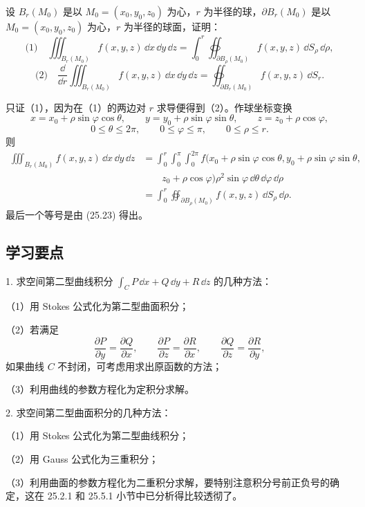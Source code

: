 \begin{xexample}[25.5.3]
设 $B_r(M_0)$ 是以 $M_0=(x_0,y_0,z_0)$ 为心，$r$ 为半径的球，$\partial B_r(M_0)$ 是以 $M_0=(x_0,y_0,z_0)$ 为心，$r$ 为半径的球面，证明：
\[
  \text{(1)}\quad \iiint_{B_r(M_0)}f(x,y,z)\,\dd x\,\dd y\,\dd z
  =\int_0^r\oiint_{\partial B_\rho(M_0)}f(x,y,z)\,\dd S_\rho\,\dd\rho,
\]
\[
  \text{(2)}\quad \frac\dd{\dd r}\iiint_{B_r(M_0)}f(x,y,z)\,\dd x\,\dd y\,\dd z
  =\oiint_{\partial B_r(M_0)}f(x,y,z)\,\dd S_r.
\]
\end{xexample}

\begin{xproof}
只证（1），因为在（1）的两边对 $r$ 求导便得到（2）。作球坐标变换
\[
  x=x_0+\rho\sin\varphi\cos\theta,\qquad
  y=y_0+\rho\sin\varphi\sin\theta,\qquad
  z=z_0+\rho\cos\varphi,
\]
\[
  0\le\theta\le2\pi,\qquad0\le\varphi\le\pi,\qquad0\le\rho\le r.
\]
则
\begin{align*}
\iiint_{B_r(M_0)}f(x,y,z)\,\dd x\,\dd y\,\dd z
&=\int_0^r\int_0^\pi\int_0^{2\pi}
 f(x_0+\rho\sin\varphi\cos\theta,
   y_0+\rho\sin\varphi\sin\theta,\\
&\qquad z_0+\rho\cos\varphi)
 \rho^2\sin\varphi\,\dd\theta\,\dd\varphi\,\dd\rho\\
&=\int_0^r\oiint_{\partial B_\rho(M_0)}f(x,y,z)\,\dd S_\rho\,\dd\rho.
\end{align*}
最后一个等号是由 (25.23) 得出。
\end{xproof}

\subsection{学习要点}

1. 求空间第二型曲线积分 $\int_C P\,\dd x+Q\,\dd y+R\,\dd z$ 的几种方法：

（1）用 Stokes 公式化为第二型曲面积分；

（2）若满足
\[
  \frac{\partial P}{\partial y}=\frac{\partial Q}{\partial x},\qquad
  \frac{\partial P}{\partial z}=\frac{\partial R}{\partial x},\qquad
  \frac{\partial Q}{\partial z}=\frac{\partial R}{\partial y},
\]
如果曲线 $C$ 不封闭，可考虑用求出原函数的方法；

（3）利用曲线的参数方程化为定积分求解。

2. 求空间第二型曲面积分的几种方法：

（1）用 Stokes 公式化为第二型曲线积分；

（2）用 Gauss 公式化为三重积分；

（3）利用曲面的参数方程化为二重积分求解，要特别注意积分号前正负号的确定，这在 25.2.1 和 25.5.1 小节中已分析得比较透彻了。

